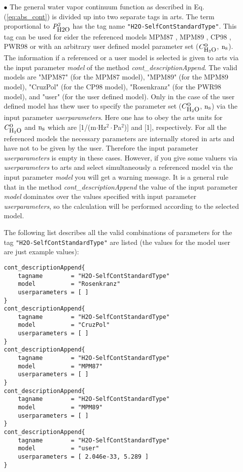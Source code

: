 \begin{itemize}
\item[$\bullet$] The general water vapor continuum function
as described in Eq. (\ref{eq:abs_cont}) is divided up into 
two separate tags in arts. The term proportional 
to $P_{\mbox{\rm \small H2O}}^2$ has the tag name {\tt "H2O-SelfContStandardType"}. 
This tag can be used for eider the referenced models 
MPM87 \citep{liebeandlayton:87}, MPM89 \citep{liebe:89}, 
CP98 \citep{cruzpol:98}, PWR98 \citep{pwr:98} or with
an arbitrary user defined model parameter set ($C^{\mbox{\rm o}}_{\mbox{\rm \small H}_{2}\mbox{\rm \small O}}$, ${\rm n}_{\mbox{\rm \small s}}$).
The information if a referenced or a user model is selected 
is given to arts via the input parameter {\it model} of the 
method {\it cont\_descriptionAppend}. The valid models are
"MPM87" (for the MPM87 model), "MPM89" (for the MPM89 model), 
"CruzPol" (for the CP98 model), "Rosenkranz" (for the PWR98 model), 
and "user"  (for the user defined model). Only in the case 
of the user defined model has thew user to specify the 
parameter set ($C^{\mbox{\rm o}}_{\mbox{\rm \small H}_{2}\mbox{\rm \small O}}$, ${\rm n}_{\mbox{\rm \small s}}$) via the input parameter 
{\it userparameters}. Here one has to obey the arts units for 
$C^{\mbox{\rm o}}_{\mbox{\rm \small H}_{2}\mbox{\rm \small O}}$ and ${\rm n}_{\mbox{\rm \small s}}$ which are $[$1/(m$\cdot$Hz$^2\cdot$Pa$^2$)$]$ and 
$[$1$]$, respectively. For all the referenced models the necessary
parameters are internally stored in arts and have not to be given by
the user. Therefore the input parameter {\it userparameters} is empty
in these cases. However, if you give some valuers via 
{\it userparameters} to arts and select simultaneously a 
referenced model via the input parameter {\it model} you will get 
a warning message. It is a general rule that in the method 
{\it cont\_descriptionAppend} the value of the input 
parameter {\it model} dominates over the values specified with 
input parameter {\it userparameters}, so the calculation will be
performed according to the selected model.

The following list describes all the valid combinations of parameters for the
tag {\tt "H2O-SelfContStandardType"} are listed (the values for the 
model user are just example values): 
\begin{verbatim}
cont_descriptionAppend{
    tagname        = "H2O-SelfContStandardType"
    model          = "Rosenkranz"
    userparameters = [ ]
}
cont_descriptionAppend{
    tagname        = "H2O-SelfContStandardType"
    model          = "CruzPol"
    userparameters = [ ]
}
cont_descriptionAppend{
    tagname        = "H2O-SelfContStandardType"
    model          = "MPM87"
    userparameters = [ ]
}
cont_descriptionAppend{
    tagname        = "H2O-SelfContStandardType"
    model          = "MPM89"
    userparameters = [ ]
}
cont_descriptionAppend{
    tagname        = "H2O-SelfContStandardType"
    model          = "user"
    userparameters = [ 2.046e-33, 5.289 ]
}
\end{verbatim}



\end{itemize}
